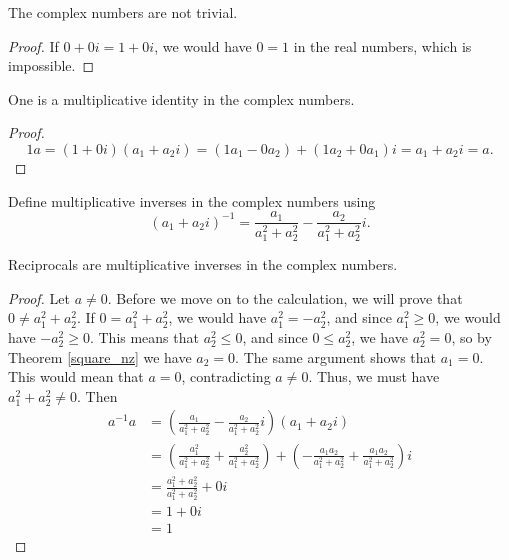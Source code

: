 \documentclass[../../math.tex]{subfiles}
\begin{document}
\begin{instance}
    The complex numbers are not trivial.
\end{instance}
\begin{proof}
    If $0 + 0i = 1 + 0i$, we would have $0 = 1$ in the real numbers, which is
    impossible.
\end{proof}

\begin{instance}
    One is a multiplicative identity in the complex numbers.
\end{instance}
\begin{proof}
    \[
        1a = (1 + 0i)(a_1 + a_2i) = (1 a_1 - 0a_2) + (1 a_2 + 0 a_1)i
        = a_1 + a_2i = a.
    \]
\end{proof}

\begin{instance}
    Define multiplicative inverses in the complex numbers using
    \[
        (a_1 + a_2i)^{-1}
        = \frac{a_1}{a_1^2 + a_2^2} - \frac{a_2}{a_1^2 + a_2^2} i.
    \]
\end{instance}

\begin{instance}
    Reciprocals are multiplicative inverses in the complex numbers.
\end{instance}
\begin{proof}
    Let $a \neq 0$.  Before we move on to the calculation, we will prove that $0
    \neq a_1^2 + a_2^2$.  If $0 = a_1^2 + a_2^2$, we would have $a_1^2 =
    -a_2^2$, and since $a_1^2 \geq 0$, we would have $-a_2^2 \geq 0$.  This
    means that $a_2^2 \leq 0$, and since $0 \leq a_2^2$, we have $a_2^2 = 0$,
    so by Theorem \ref{square_nz} we have $a_2 = 0$.  The same argument shows
    that $a_1 = 0$.  This would mean that $a = 0$, contradicting $a \neq 0$.
    Thus, we must have $a_1^2 + a_2^2 \neq 0$.  Then
    \begin{align*}
        a^{-1}a
        &= \left( \frac{a_1}{a_1^2 + a_2^2} - \frac{a_2}{a_1^2 + a_2^2}i \right)
            (a_1 + a_2i) \\
        &= \left( \frac{a_1^2}{a_1^2 + a_2^2} +
                \frac{a_2^2}{a_1^2 + a_2^2} \right) +
            \left( -\frac{a_1a_2}{a_1^2 + a_2^2} +
                \frac{a_1a_2}{a_1^2 + a_2^2} \right)i \\
        &= \frac{a_1^2 + a_2^2}{a_1^2 + a_2^2} + 0i \\
        &= 1 + 0i \\
        &= 1
    \end{align*}
\end{proof}
\end{document}
